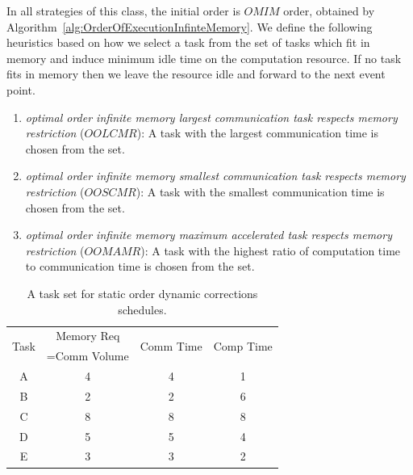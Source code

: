 \documentclass[runningheads]{llncs} %
\begin{document}
In all strategies of this class, the initial order is $OMIM$ order,  obtained by Algorithm~\ref{alg:OrderOfExecutionInfinteMemory}. We define the following heuristics based on how we select a task from the set of tasks which fit in memory and induce minimum idle time on the computation resource. If no task fits in memory then we leave the resource idle and forward to the next event point.

\begin{enumerate}[label=\roman*)]
	\item \textit{optimal order infinite memory largest communication task respects memory restriction} ($OOLCMR$): A task with the largest communication time is chosen from the set.
	\item \textit{optimal order infinite memory smallest communication task respects memory restriction} ($OOSCMR$): A task with the smallest communication time is chosen from the set.
	\item \textit{optimal order infinite memory maximum accelerated task respects memory restriction} ($OOMAMR$): A task  with the highest ratio of computation time to communication time is chosen from the set.
\end{enumerate}

\begin{table}[htb]
	\begin{center}
		
		\begin{tabular}{|c|c|c|c|}
			\hline
			\multirow{2}{*}{Task} & Memory Req & \multirow{2}{*}{Comm Time} & \multirow{2}{*}{Comp Time}\\  
			&=Comm Volume && \\ \hline
			A & 4 & 4 &  1\\ \hline
			B & 2 & 2 & 6\\ \hline
			C & 8 & 8 & 8\\ \hline
			D & 5 & 5 & 4\\ \hline
			E & 3 & 3 & 2\\ \hline
		\end{tabular}
		\caption{\label{tab:staticOrderDynamicCorrectionsExample} A task set for static order dynamic corrections schedules.}
	\end{center}
\end{table}
\end{document}

